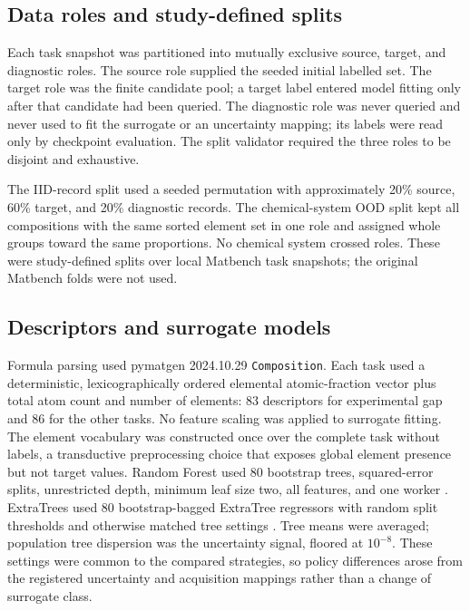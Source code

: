 \documentclass[10pt,twocolumn]{article}
\begin{document}
\subsection{Data roles and study-defined splits}
Each task snapshot was partitioned into mutually exclusive source, target, and
diagnostic roles. The source role supplied the seeded initial labelled set.
The target role was the finite candidate pool; a target label entered model
fitting only after that candidate had been queried. The diagnostic role was
never queried and never used to fit the surrogate or an uncertainty mapping;
its labels were read only by checkpoint evaluation. The split validator
required the three roles to be disjoint and exhaustive.

The IID-record split used a seeded permutation with approximately 20\% source,
60\% target, and 20\% diagnostic records. The chemical-system OOD split kept
all compositions with the same sorted element set in one role and assigned
whole groups toward the same proportions. No chemical system crossed roles.
These were study-defined splits over local Matbench task snapshots; the
original Matbench folds were not used.

\subsection{Descriptors and surrogate models}
Formula parsing used pymatgen 2024.10.29 \texttt{Composition}. Each task used
a deterministic, lexicographically ordered elemental atomic-fraction vector
plus total atom count and number of elements: 83 descriptors for experimental
gap and 86 for the other tasks. No feature scaling was applied to surrogate
fitting. The element vocabulary was constructed once over the complete task
without labels, a transductive preprocessing choice that exposes global
element presence but not target values. Random Forest used 80 bootstrap trees, squared-error splits,
unrestricted depth, minimum leaf size two, all features, and one worker
\citep{breiman2001rf,meinshausen2006qrf,wager2014confidence,mentch2016uncertainty}.
ExtraTrees used 80 bootstrap-bagged ExtraTree regressors with random split
thresholds and otherwise matched tree settings
\citep{geurts2006extratrees}. Tree means were averaged; population tree
dispersion was the uncertainty signal, floored at $10^{-8}$. These settings
were common to the compared strategies, so policy differences arose from the
registered uncertainty and acquisition mappings rather than a change of
surrogate class.
\end{document}
